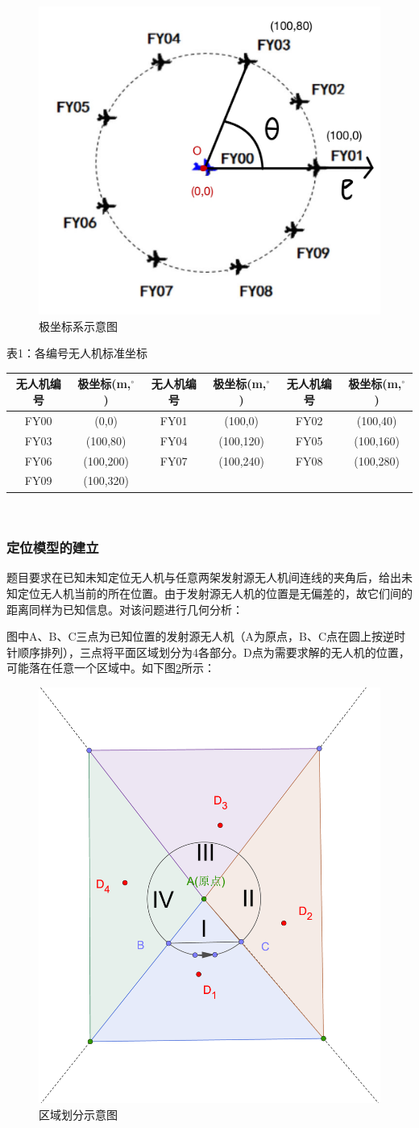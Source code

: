 \documentclass{ctexart}
\begin{document}
\begin{figure}[H]
  \centering
  \includegraphics[width=0.40\linewidth]{pic/极坐标.jpg}
  \caption{极坐标系示意图}
  \label{极坐标系示意图}
  \end{figure} 

\begin{center}
  表1：各编号无人机标准坐标
  ~\\
    \begin{tabular}{|c|c|c|c|c|c|}
        \hline
        无人机编号&极坐标(m,$^{\circ}$)&无人机编号&极坐标(m,$^{\circ}$)&无人机编号&极坐标(m,$^{\circ}$)\\
        \hline
        FY00&(0,0)&FY01&(100,0)&FY02&(100,40)\\
        \hline
        FY03&(100,80)&FY04&(100,120)&FY05&(100,160)\\
        \hline
        FY06&(100,200)&FY07&(100,240)&FY08&(100,280)\\
        \hline
        FY09&(100,320)& & & &\\    

        \hline
    \end{tabular}\\
\end{center}
\subsubsection{定位模型的建立}
题目要求在已知未知定位无人机与任意两架发射源无人机间连线的夹角后，给出未知定位无人机当前的所在位置。由于发射源无人机的位置是无偏差的，故它们间的距离同样为已知信息。对该问题进行几何分析：

图中A、B、C三点为已知位置的发射源无人机（A为原点，B、C点在圆上按逆时针顺序排列），三点将平面区域划分为4各部分。D点为需要求解的无人机的位置，可能落在任意一个区域中。如下图\ref{区域划分示意图}所示：

\begin{figure}[H]
  \centering
  \includegraphics[width=0.40\linewidth]{pic/quadrant(1).eps}
  \caption{区域划分示意图}
  \label{区域划分示意图}
  \end{figure} 
\end{document}
